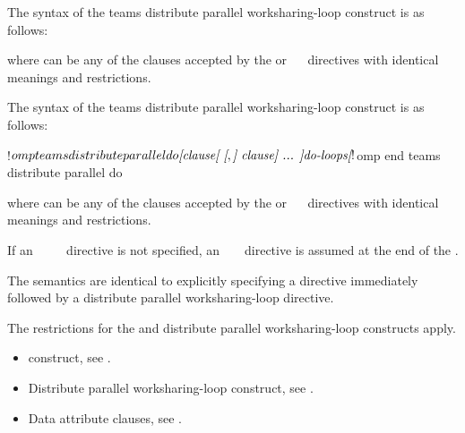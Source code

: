 \syntax
\begin{ccppspecific}
The syntax of the teams distribute parallel worksharing-loop construct is as follows:

\begin{ompcPragma}[fontsize=\small]
#pragma omp teams distribute parallel for \plc{\}
            \plc{[clause[ [},\plc{] clause] ...  ] new-line}
    \plc{for-loops}
\end{ompcPragma}

where  can be any of the clauses accepted by the  or
~~ directives with identical meanings 
and restrictions.
\end{ccppspecific}

\begin{fortranspecific}
The syntax of the teams distribute parallel worksharing-loop construct is as follows:

\begin{ompfPragma}
!$omp teams distribute parallel do \plc{[clause[ [},\plc{] clause] ... ]}
   \plc{do-loops}
\plc{[} !$omp end teams distribute parallel do \plc{]}
\end{ompfPragma}

where  can be any of the clauses accepted by the  or
~~ directives with identical meanings 
and restrictions.

If an ~~~~ directive 
is not specified, an ~ 
~ directive is assumed at the end of the .
\end{fortranspecific}

\descr
The semantics are identical to explicitly specifying a  directive 
immediately followed by a distribute parallel worksharing-loop directive.

\restrictions
The restrictions for the  and distribute parallel worksharing-loop 
constructs apply.

\crossreferences
\begin{itemize}
\item {} construct, see
.

\item Distribute parallel worksharing-loop construct, see
.

\item Data attribute clauses, see
.
\end{itemize}



